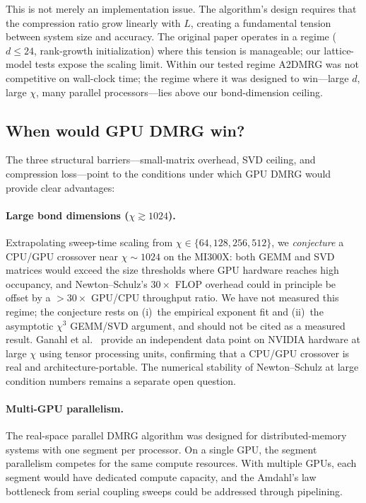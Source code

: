 \documentclass[preprint,12pt]{elsarticle}
\begin{document}
This is not merely an implementation issue.  The algorithm's design requires that the compression ratio grow linearly with $L$, creating a fundamental tension between system size and accuracy.  The original paper \cite{Grigori2025} operates in a regime ($d \leq 24$, rank-growth initialization) where this tension is manageable; our lattice-model tests expose the scaling limit.
Within our tested regime A2DMRG was not competitive on wall-clock time; the regime where it was designed to win---large $d$, large $\chi$, many parallel processors---lies above our bond-dimension ceiling.

\subsection{When would GPU DMRG win?}
\label{sec:when_gpu_wins}

The three structural barriers---small-matrix overhead, SVD ceiling, and compression loss---point to the conditions under which GPU DMRG would provide clear advantages:

\paragraph{Large bond dimensions ($\chi \gtrsim 1024$).}
Extrapolating sweep-time scaling from $\chi \in \{64, 128, 256, 512\}$, we \emph{conjecture} a CPU/GPU crossover near $\chi \sim 1024$ on the MI300X: both GEMM and SVD matrices would exceed the size thresholds where GPU hardware reaches high occupancy, and Newton--Schulz's $30\times$ FLOP overhead could in principle be offset by a $> 30\times$ GPU/CPU throughput ratio.
We have not measured this regime; the conjecture rests on (i)~the empirical exponent fit and (ii)~the asymptotic $\chi^3$ GEMM/SVD argument, and should not be cited as a measured result.
Ganahl et al.~\cite{Ganahl2023} provide an independent data point on NVIDIA hardware at large $\chi$ using tensor processing units, confirming that a CPU/GPU crossover is real and architecture-portable.
The numerical stability of Newton--Schulz at large condition numbers remains a separate open question.

\paragraph{Multi-GPU parallelism.}
The real-space parallel DMRG algorithm \cite{Stoudenmire2013} was designed for distributed-memory systems with one segment per processor.
On a single GPU, the segment parallelism competes for the same compute resources.
With multiple GPUs, each segment would have dedicated compute capacity, and the Amdahl's law bottleneck from serial coupling sweeps could be addressed through pipelining.
\end{document}
